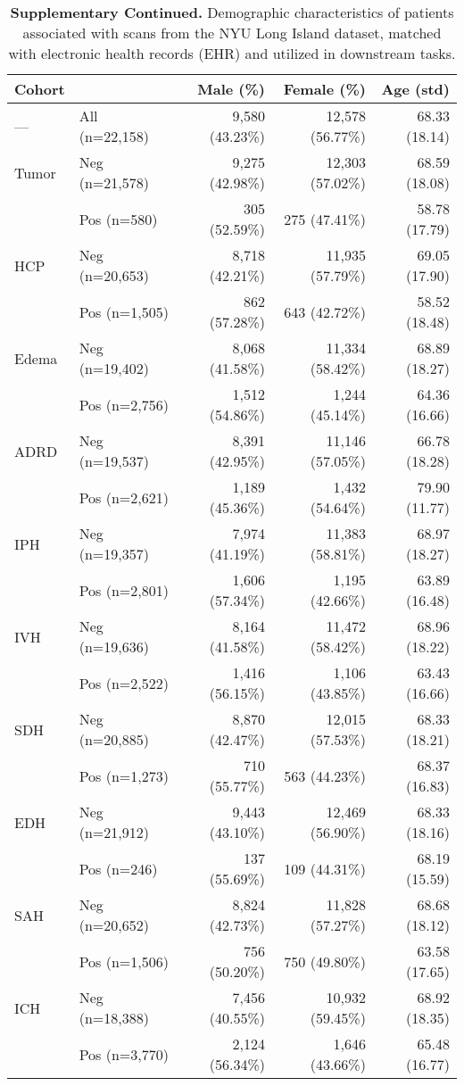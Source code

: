 \begin{table}[!h]
    \centering
    \caption*{\textbf{Supplementary  Continued.} Demographic characteristics of patients associated with scans from the NYU Long Island dataset, matched with electronic health records (EHR) and utilized in downstream tasks.}
\begin{tabular}{ll|rr|r}
\toprule
                       \textbf{Cohort} &  &           \textbf{Male (\%)} &          \textbf{Female (\%)} &     \textbf{Age (std)} \\
\midrule
--- & All (n=22,158) & 9,580 (43.23\%) & 12,578 (56.77\%) & 68.33 (18.14) \\
\midrule
Tumor & Neg (n=21,578) & 9,275 (42.98\%) & 12,303 (57.02\%) & 68.59 (18.08) \\
      & Pos (n=580) &   305 (52.59\%) &    275 (47.41\%) & 58.78 (17.79) \\
\midrule
HCP   & Neg (n=20,653) & 8,718 (42.21\%) & 11,935 (57.79\%) & 69.05 (17.90) \\
      & Pos (n=1,505) &   862 (57.28\%) &    643 (42.72\%) & 58.52 (18.48) \\
\midrule
Edema & Neg (n=19,402) & 8,068 (41.58\%) & 11,334 (58.42\%) & 68.89 (18.27) \\
      & Pos (n=2,756) & 1,512 (54.86\%) &  1,244 (45.14\%) & 64.36 (16.66) \\
\midrule
ADRD  & Neg (n=19,537) & 8,391 (42.95\%) & 11,146 (57.05\%) & 66.78 (18.28) \\
      & Pos (n=2,621) & 1,189 (45.36\%) &  1,432 (54.64\%) & 79.90 (11.77) \\
\midrule
IPH   & Neg (n=19,357) & 7,974 (41.19\%) & 11,383 (58.81\%) & 68.97 (18.27) \\
      & Pos (n=2,801) & 1,606 (57.34\%) &  1,195 (42.66\%) & 63.89 (16.48) \\
\midrule
IVH   & Neg (n=19,636) & 8,164 (41.58\%) & 11,472 (58.42\%) & 68.96 (18.22) \\
      & Pos (n=2,522) & 1,416 (56.15\%) &  1,106 (43.85\%) & 63.43 (16.66) \\
\midrule
SDH   & Neg (n=20,885) & 8,870 (42.47\%) & 12,015 (57.53\%) & 68.33 (18.21) \\
      & Pos (n=1,273) &   710 (55.77\%) &    563 (44.23\%) & 68.37 (16.83) \\
\midrule
EDH   & Neg (n=21,912) & 9,443 (43.10\%) & 12,469 (56.90\%) & 68.33 (18.16) \\
      & Pos (n=246) &   137 (55.69\%) &    109 (44.31\%) & 68.19 (15.59) \\
\midrule
SAH   & Neg (n=20,652) & 8,824 (42.73\%) & 11,828 (57.27\%) & 68.68 (18.12) \\
      & Pos (n=1,506) &   756 (50.20\%) &    750 (49.80\%) & 63.58 (17.65) \\
\midrule
ICH   & Neg (n=18,388) & 7,456 (40.55\%) & 10,932 (59.45\%) & 68.92 (18.35) \\
      & Pos (n=3,770) & 2,124 (56.34\%) &  1,646 (43.66\%) & 65.48 (16.77) \\
\bottomrule
\end{tabular}
\end{table}
